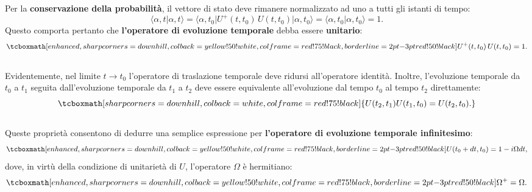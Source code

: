 \documentclass[a4paper,12pt,oneside]{book}
\begin{document}
Per la \textbf{conservazione della probabilità}, il vettore di stato deve rimanere normalizzato ad uno a tutti gli istanti di tempo:
	\begin{equation}
		\langle \alpha, t \vert \alpha, t \rangle =
\langle \alpha, t_0 \vert U^+ (t,t_0)\, U(t,t_0)\vert \alpha, t_0 \rangle =  \langle \alpha, t_0 \vert \alpha, t_0 \rangle =1.
	\end{equation}
Questo comporta pertanto che  \textbf{l'operatore di evoluzione temporale} debba essere \textbf{unitario}:
	\begin{equation}
		\tcboxmath[enhanced, sharp corners=downhill, colback=yellow!50!white, colframe=red!75!black, borderline={2pt}{-3pt}{red!50!black}]{
			U^+ (t,t_0)\, U(t,t_0)=1.
			}
	\end{equation}\\
	
Evidentemente, nel limite $t\longrightarrow t_0$ l'operatore di traslazione temporale deve ridursi all'operatore identità. Inoltre, l'evoluzione temporale da $t_0$ a $t_1$ seguita dall'evoluzione temporale da $t_1$ a $t_2$ deve essere equivalente all'evoluzione dal tempo $t_0$ al tempo $t_2$ direttamente:
	\begin{equation}
		\tcboxmath[sharp corners=downhill, colback=white, colframe=red!75!black]{
			U (t_2,t_1) U(t_1,t_0)=U(t_2,t_0).
			}
	\end{equation}\\
	
Queste proprietà consentono di dedurre una semplice espressione per \textbf{l'operatore di evoluzione temporale infinitesimo}:
	\begin{equation}
		\tcboxmath[enhanced, sharp corners=downhill, colback=yellow!50!white, colframe=red!75!black, borderline={2pt}{-3pt}{red!50!black}]{
			U(t_0+dt,t_0) = 1-i\Omega dt,
			}
		\label{eq:cap8_1}
	\end{equation}
dove, in virtù della condizione di unitarietà di $U$, l'operatore $\Omega$ è hermitiano:
	\begin{equation}
		\tcboxmath[enhanced, sharp corners=downhill, colback=yellow!50!white, colframe=red!75!black, borderline={2pt}{-3pt}{red!50!black}]{
			\Omega ^+ = \Omega.
			}
	\end{equation}\\
	
\end{document}
